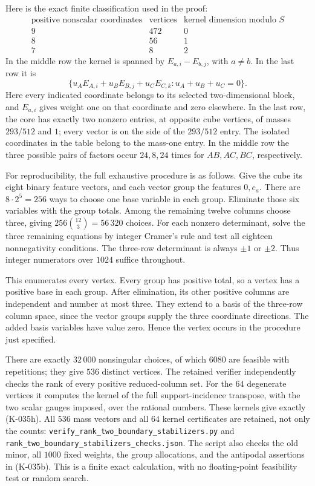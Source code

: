 Here is the exact finite classification used in the proof:
\[
\begin{array}{c|r|c}
\text{positive nonscalar coordinates}&\text{vertices}
 &\text{kernel dimension modulo }S\\ \hline
9&472&0\\
8&56&1\\
7&8&2
\end{array}                                                   \tag{K-035h}
\]
In the middle row the kernel is spanned by
$E_{a,i}-E_{b,j}$, with $a\ne b$.  In the last row it is
\[
 \{u_AE_{A,i}+u_BE_{B,j}+u_CE_{C,k}:u_A+u_B+u_C=0\}.
\]
Here every indicated coordinate belongs to its selected
two-dimensional block, and $E_{a,i}$ gives weight one on that
coordinate and zero elsewhere.  In the last row, the core has
exactly two nonzero entries, at opposite cube vertices, of masses
$293/512$ and $1$; every vector is on the side of the $293/512$
entry.  The isolated coordinates in the table belong to the
mass-one entry.  In the middle row the three possible pairs of
factors occur $24,8,24$ times for $AB,AC,BC$, respectively.

For reproducibility, the full exhaustive procedure is as follows.
Give the cube its eight binary feature vectors, and each vector
group the features $0,e_a$.  There are $8\cdot2^5=256$ ways to
choose one base variable in each group.  Eliminate those six
variables with the group totals.  Among the remaining twelve
columns choose three, giving $256\binom{12}{3}=56\,320$ choices.
For each nonzero determinant, solve the three remaining equations
by integer Cramer's rule and test all eighteen nonnegativity
conditions.  The three-row determinant is always $\pm1$ or $\pm2$.
Thus integer numerators over $1024$ suffice throughout.

This enumerates every vertex.  Every group has positive total, so
a vertex has a positive base in each group.  After elimination,
its other positive columns are independent and number at most
three.  They extend to a basis of the three-row column space,
since the vector groups supply the three coordinate directions.
The added basis variables have value zero.  Hence the vertex
occurs in the procedure just specified.

There are exactly $32\,000$ nonsingular choices, of which $6080$
are feasible with repetitions; they give $536$ distinct vertices.
The retained verifier independently checks the rank of every
positive reduced-column set.  For the $64$ degenerate vertices
it computes the kernel of the full support-incidence transpose,
with the two scalar gauges imposed, over the rational numbers.
These kernels give exactly (K-035h).  All $536$ mass vectors and
all $64$ kernel certificates are retained, not only the counts:
\texttt{verify\_rank\_two\_boundary\_stabilizers.py} and
\texttt{rank\_two\_boundary\_stabilizers\_checks.json}.
The script also checks the old minor, all $1000$ fixed weights,
the group allocations, and the antipodal assertions in (K-035b).
This is a finite exact calculation, with no floating-point
feasibility test or random search.

